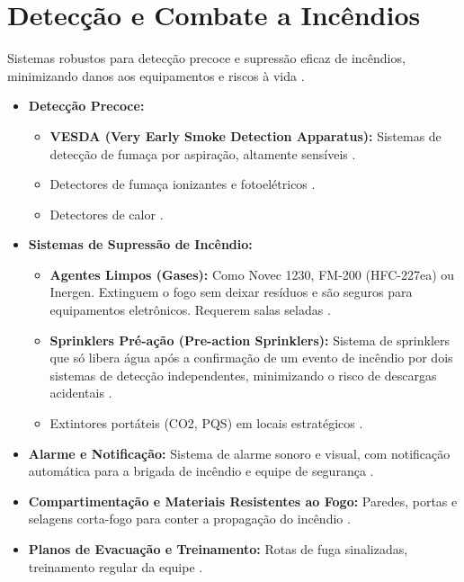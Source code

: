 \documentclass[
	12pt,				%
	oneside,			%
	a4paper,			%
	english,			%
	brazil				%
	]{abntex2unama}
\begin{document}
\section{Detecção e Combate a Incêndios}
Sistemas robustos para detecção precoce e supressão eficaz de incêndios, minimizando danos aos equipamentos e riscos à vida \cite{disaster_recovery}.
\begin{itemize}
	\item \textbf{Detecção Precoce:}
	      \begin{itemize}
		      \item \textbf{VESDA (Very Early Smoke Detection Apparatus):} Sistemas de detecção de fumaça por aspiração, altamente sensíveis \cite{datacenter_security}.
		      \item Detectores de fumaça ionizantes e fotoelétricos \cite{reliability_engineering}.
		      \item Detectores de calor \cite{cooling_technologies}.
	      \end{itemize}
	\item \textbf{Sistemas de Supressão de Incêndio:}
	      \begin{itemize}
		      \item \textbf{Agentes Limpos (Gases):} Como Novec 1230, FM-200 (HFC-227ea) ou Inergen. Extinguem o fogo sem deixar resíduos e são seguros para equipamentos eletrônicos. Requerem salas seladas \cite{datacenter_security}.
		      \item \textbf{Sprinklers Pré-ação (Pre-action Sprinklers):} Sistema de sprinklers que só libera água após a confirmação de um evento de incêndio por dois sistemas de detecção independentes, minimizando o risco de descargas acidentais \cite{disaster_recovery}.
		      \item Extintores portáteis (CO2, PQS) em locais estratégicos \cite{reliability_engineering}.
	      \end{itemize}
	\item \textbf{Alarme e Notificação:} Sistema de alarme sonoro e visual, com notificação automática para a brigada de incêndio e equipe de segurança \cite{dcim_evolution}.
	\item \textbf{Compartimentação e Materiais Resistentes ao Fogo:} Paredes, portas e selagens corta-fogo para conter a propagação do incêndio \cite{design_principles}.
	\item \textbf{Planos de Evacuação e Treinamento:} Rotas de fuga sinalizadas, treinamento regular da equipe \cite{datacenter_security}.
\end{itemize}
\end{document}
